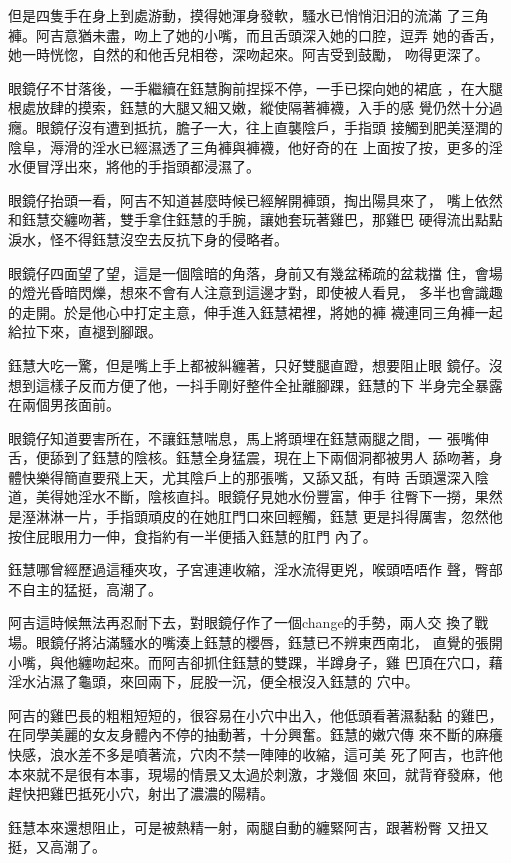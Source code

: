 但是四隻手在身上到處游動，摸得她渾身發軟，騷水已悄悄汨汨的流滿
了三角褲。阿吉意猶未盡，吻上了她的小嘴，而且舌頭深入她的口腔，逗弄
她的香舌，她一時恍惚，自然的和他舌兒相卷，深吻起來。阿吉受到鼓勵，
吻得更深了。

眼鏡仔不甘落後，一手繼續在鈺慧胸前捏採不停，一手已探向她的裙底
，在大腿根處放肆的摸索，鈺慧的大腿又細又嫩，縱使隔著褲襪，入手的感
覺仍然十分過癮。眼鏡仔沒有遭到抵抗，膽子一大，往上直襲陰戶，手指頭
接觸到肥美溼潤的陰阜，溽滑的淫水已經濕透了三角褲與褲襪，他好奇的在
上面按了按，更多的淫水便冒浮出來，將他的手指頭都浸濕了。

眼鏡仔抬頭一看，阿吉不知道甚麼時候已經解開褲頭，掏出陽具來了，
嘴上依然和鈺慧交纏吻著，雙手拿住鈺慧的手腕，讓她套玩著雞巴，那雞巴
硬得流出點點淚水，怪不得鈺慧沒空去反抗下身的侵略者。

眼鏡仔四面望了望，這是一個陰暗的角落，身前又有幾盆稀疏的盆栽擋
住，會場的燈光昏暗閃爍，想來不會有人注意到這邊才對，即使被人看見，
多半也會識趣的走開。於是他心中打定主意，伸手進入鈺慧裙裡，將她的褲
襪連同三角褲一起給拉下來，直褪到腳跟。

鈺慧大吃一驚，但是嘴上手上都被糾纏著，只好雙腿直蹬，想要阻止眼
鏡仔。沒想到這樣子反而方便了他，一抖手剛好整件全扯離腳踝，鈺慧的下
半身完全暴露在兩個男孩面前。

眼鏡仔知道要害所在，不讓鈺慧喘息，馬上將頭埋在鈺慧兩腿之間，一
張嘴伸舌，便舔到了鈺慧的陰核。鈺慧全身猛震，現在上下兩個洞都被男人
舔吻著，身體快樂得簡直要飛上天，尤其陰戶上的那張嘴，又舔又舐，有時
舌頭還深入陰道，美得她淫水不斷，陰核直抖。眼鏡仔見她水份豐富，伸手
往臀下一撈，果然是溼淋淋一片，手指頭頑皮的在她肛門口來回輕觸，鈺慧
更是抖得厲害，忽然他按住屁眼用力一伸，食指約有一半便插入鈺慧的肛門
內了。

鈺慧哪曾經歷過這種夾攻，子宮連連收縮，淫水流得更兇，喉頭唔唔作
聲，臀部不自主的猛挺，高潮了。

阿吉這時候無法再忍耐下去，對眼鏡仔作了一個change的手勢，兩人交
換了戰場。眼鏡仔將沾滿騷水的嘴湊上鈺慧的櫻唇，鈺慧已不辨東西南北，
直覺的張開小嘴，與他纏吻起來。而阿吉卻抓住鈺慧的雙踝，半蹲身子，雞
巴頂在穴口，藉淫水沾濕了龜頭，來回兩下，屁股一沉，便全根沒入鈺慧的
穴中。

阿吉的雞巴長的粗粗短短的，很容易在小穴中出入，他低頭看著濕黏黏
的雞巴，在同學美麗的女友身體內不停的抽動著，十分興奮。鈺慧的嫩穴傳
來不斷的麻癢快感，浪水差不多是噴著流，穴肉不禁一陣陣的收縮，這可美
死了阿吉，也許他本來就不是很有本事，現場的情景又太過於刺激，才幾個
來回，就背脊發麻，他趕快把雞巴抵死小穴，射出了濃濃的陽精。

鈺慧本來還想阻止，可是被熱精一射，兩腿自動的纏緊阿吉，跟著粉臀
又扭又挺，又高潮了。

